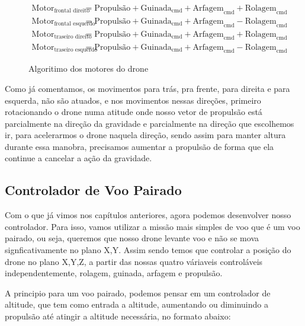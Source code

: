 	\begin{figure}[h]
		\centering
		\begin{equation*}
			\begin{aligned}
				\text{Motor}_{\text{frontal direito}} & = \text{Propulsão} + \text{Guinada}_{\text{cmd}} + \text{Arfagem}_{\text{cmd}} + \text{Rolagem}_{\text{cmd}} \\
				\text{Motor}_{\text{frontal esquerdo}} & = \text{Propulsão} + \text{Guinada}_{\text{cmd}} + \text{Arfagem}_{\text{cmd}} - \text{Rolagem}_{\text{cmd}} \\
				\text{Motor}_{\text{traseiro direito}} & = \text{Propulsão} + \text{Guinada}_{\text{cmd}} + \text{Arfagem}_{\text{cmd}} + \text{Rolagem}_{\text{cmd}} \\
				\text{Motor}_{\text{traseiro esquerdo}} & = \text{Propulsão} + \text{Guinada}_{\text{cmd}} + \text{Arfagem}_{\text{cmd}} - \text{Rolagem}_{\text{cmd}}
			\end{aligned}
		\end{equation*}
		\caption{Algoritimo dos motores do drone}
	\end{figure}

Como já comentamos, os movimentos para trás, pra frente, para direita e para esquerda, não são atuados, e nos movimentos nessas direções, primeiro rotacionando o drone numa atitude onde nosso vetor de propulsão está parcialmente na direção da gravidade e parcialmente na direção que escolhemos ir, para acelerarmos o drone naquela direção, sendo assim para manter altura durante essa manobra, precisamos aumentar a propulsão de forma que ela continue a cancelar a ação da gravidade.

\subsection*{Controlador de Voo Pairado}

Com o que já vimos nos capítulos anteriores, agora podemos desenvolver nosso controlador. Para isso, vamos utilizar a missão mais simples de voo que é um voo pairado, ou seja, queremos que nosso drone levante voo e não se mova signficativamente no plano X,Y. Assim sendo temos que controlar a posição do drone no plano X,Y,Z, a partir das nossas quatro váriaveis controláveis independentemente, rolagem, guinada, arfagem e propulsão.

A principio para um voo pairado, podemos pensar em um controlador de altitude,  que tem como entrada a altitude, aumentando ou diminuindo a propulsão até atingir a altitude necessária, no formato abaixo:

